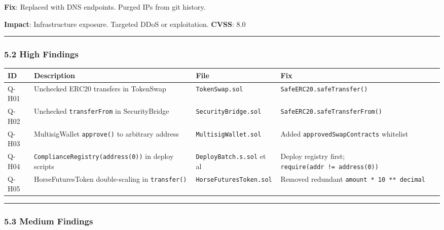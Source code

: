 \documentclass[
]{article}
\newcounter{none} %
\begin{document}
\textbf{Fix}: Replaced with DNS endpoints. Purged IPs from git history.

\textbf{Impact}: Infrastructure exposure. Targeted DDoS or exploitation.
\textbf{CVSS}: 8.0

\begin{center}\rule{0.5\linewidth}{0.5pt}\end{center}

\subsubsection{5.2 High Findings}\label{52-high-findings}

{\def\LTcaptype{none} %
\begin{longtable}[]{@{}llll@{}}
\toprule\noalign{}
ID & Description & File & Fix \\
\midrule\noalign{}
\endhead
\bottomrule\noalign{}
\endlastfoot
Q-H01 & Unchecked ERC20 transfers in TokenSwap & \texttt{TokenSwap.sol}
& \texttt{SafeERC20.safeTransfer()} \\
Q-H02 & Unchecked \texttt{transferFrom} in SecurityBridge &
\texttt{SecurityBridge.sol} & \texttt{SafeERC20.safeTransferFrom()} \\
Q-H03 & MultisigWallet \texttt{approve()} to arbitrary address &
\texttt{MultisigWallet.sol} & Added \texttt{approvedSwapContracts}
whitelist \\
Q-H04 & \texttt{ComplianceRegistry(address(0))} in deploy scripts &
\texttt{DeployBatch.s.sol} et al & Deploy registry first;
\texttt{require(addr\ !=\ address(0))} \\
Q-H05 & HorseFuturesToken double-scaling in \texttt{transfer()} &
\texttt{HorseFuturesToken.sol} & Removed redundant
\texttt{amount\ *\ 10\ **\ decimal} \\
\end{longtable}
}

\begin{center}\rule{0.5\linewidth}{0.5pt}\end{center}

\subsubsection{5.3 Medium Findings}\label{53-medium-findings}
\end{document}
